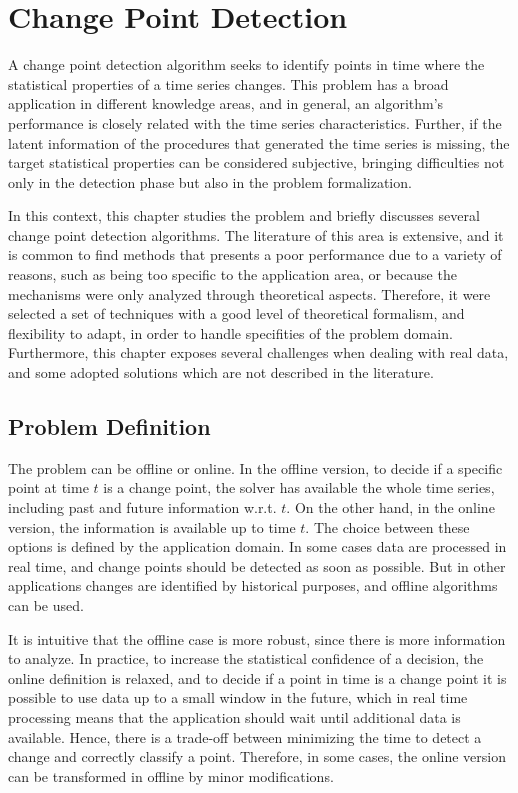 \chapter{Change Point Detection}

A change point detection algorithm seeks to identify points in time where the
statistical properties of a time series changes. This problem has a broad
application in different knowledge areas, and in general, an algorithm's
performance is closely related with the time series characteristics.
Further, if the latent information of the procedures that generated the time
series is missing, the target statistical properties can be considered
subjective, bringing difficulties not only in the detection phase but also in
the problem formalization.

In this context, this chapter studies the problem and briefly discusses
several change point detection algorithms. The literature of this area is
extensive, and it is common to find methods that presents a poor performance
due to a variety of reasons, such as being too specific to the application
area, or because the mechanisms were only analyzed through theoretical
aspects. Therefore, it were selected a set of techniques with a good level
of theoretical formalism, and flexibility to adapt, in order to handle
specifities of the problem domain. Furthermore, this chapter exposes several
challenges when dealing with real data, and some adopted solutions which are
not described in the literature.

\section{Problem Definition}

The problem can be offline or online. In the offline version, to decide if a
specific point at time $t$ is a change point, the solver has available the
whole time series, including past and future information w.r.t. $t$. On the
other hand, in the online version, the information is available up to time $t$.
The choice between these options is defined by the application domain. In some
cases data are processed in real time, and change points should be detected as
soon as possible. But in other applications changes are identified by historical
purposes, and offline algorithms can be used.

It is intuitive that the offline case is more robust, since there is more
information to analyze. In practice, to increase the statistical confidence of
a decision, the online definition is relaxed, and to decide if a point in time
is a change point it is possible to use data up to a small window in the future,
which in real time processing means that the application should wait until
additional data is available. Hence, there is a trade-off between minimizing
the time to detect a change and correctly classify a point. Therefore, in some
cases, the online version can be transformed in offline by minor modifications.

